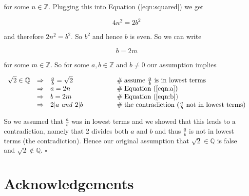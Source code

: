 \documentclass[11pt, oneside]{article}   	%
\theoremstyle{definition}
\begin{document}
\bigskip
\noindent
for some $n \in \mathbb{Z}$. Plugging this into Equation
(\ref{eqn:squared}) we get 

\begin{equation*}
4 n^2 = 2 b^2
\end{equation*}

\medskip
\noindent
and therefore $2n^2 = b^2$. So $b^2$ and hence $b$ is even. So we
can write 

\begin{equation}
 b = 2 m
 \label{eqn:b}
 \end{equation}

 \medskip
 \noindent
 for some $m \in \mathbb{Z}$. So for some $a,b \in \mathbb{Z}$
 and  $b \neq 0$ our assumption implies 


\begin{equation*}
\begin{array}{llll}
\sqrt{2} \in \mathbb{Q} 
&\Rightarrow& \frac{a}{b} = \sqrt{2}            &\qquad \qquad \mathrel{\#} \text{assume $\frac{a}{b}$ is in lowest terms} \\
&\Rightarrow& a = 2n                            &\qquad \qquad \mathrel{\#} \text{Equation (\ref{eqn:a})} \\
&\Rightarrow& b = 2m                            &\qquad \qquad \mathrel{\#} \text{Equation (\ref{eqn:b})} \\
&\Rightarrow& \text{$2|a$ \emph{and} $2|b$}     &\qquad \qquad \mathrel{\#} \text{the contradiction ($\frac{a}{b}$ not in lowest terms)}
\end{array}
\end{equation*}


\bigskip
\noindent
So we assumed that $\frac{a}{b}$ was in lowest terms and we
showed that this leads to a contradiction, namely that 2 divides
both $a$ and $b$ and thus $\frac{a}{b}$ is not in lowest terms
(the contradiction). Hence our original assumption that $\sqrt{2}
\in \mathbb{Q}$ is false and $\sqrt{2} \notin
\mathbb{Q}$. $\square$

\section*{Acknowledgements}



\end{document}
